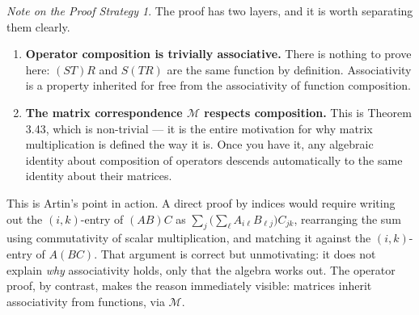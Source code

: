 \documentclass[12pt]{article}
\theoremstyle{remark}
\newtheorem*{note}{Note on the Proof Strategy}
\begin{document}
\begin{note}
The proof has two layers, and it is worth separating them clearly.
 
\begin{enumerate}
    \item \textbf{Operator composition is trivially associative.} There is
          nothing to prove here: $(ST)R$ and $S(TR)$ are the same function by
          definition. Associativity is a property inherited for free from the
          associativity of function composition.
 
    \item \textbf{The matrix correspondence $\mathcal{M}$ respects composition.}
          This is Theorem 3.43, which is non-trivial --- it is the entire
          motivation for why matrix multiplication is defined the way it is.
          Once you have it, any algebraic identity about composition of operators
          descends automatically to the same identity about their matrices.
\end{enumerate}
 
This is Artin's point in action. A direct proof by indices would require
writing out the $(i,k)$-entry of $(AB)C$ as
$\sum_{j}\bigl(\sum_{\ell} A_{i\ell}B_{\ell j}\bigr)C_{jk}$,
rearranging the sum using commutativity of scalar multiplication, and matching
it against the $(i,k)$-entry of $A(BC)$. That argument is correct but
unmotivating: it does not explain \emph{why} associativity holds, only that the
algebra works out. The operator proof, by contrast, makes the reason immediately
visible: matrices inherit associativity from functions, via $\mathcal{M}$.
\end{note}
 
\end{document}
